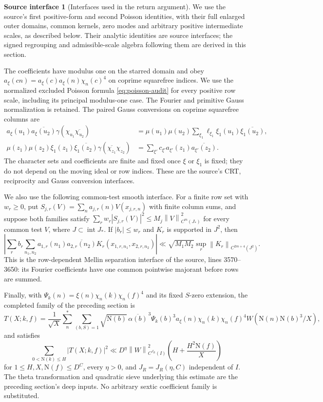 \documentclass[11pt]{article}
\numberwithin{equation}{section}
\theoremstyle{definition}
\newtheorem{assumption}[theorem]{Source interface}
\theoremstyle{remark}
\newcommand{\N}{\mathrm N}
\newcommand{\norm}[1]{\left\|#1\right\|}
\begin{document}
\begin{assumption}[Interfaces used in the return argument]
\label{ass:transfer-interfaces}
We use the source's first positive-form and second Poisson identities,
with their full enlarged outer domains, common kernels, zero modes
and arbitrary positive intermediate scales, as described below.
Their analytic identities are source interfaces; the signed
regrouping and admissible-scale algebra following them are derived
in this section.

The coefficients have modulus one on the starred domain and obey
$a_\xi(cn)=a_\xi(c)a_\xi(n)\chi_n(c)^4$ on coprime squarefree indices.
We use the normalized excluded Poisson formula \eqref{eq:poisson-audit}
for every positive row scale, including its principal modulus-one case.
The Fourier and primitive Gauss normalization is retained. The paired Gauss
conversions on coprime squarefree columns are
\[
\begin{aligned}
 a_\xi(u_1)\overline{a_\xi(u_2)}\gamma(\chi_{u_1}\overline{\chi_{u_2}})
 &=\mu(u_1)\mu(u_2)\sum_{\xi_1}\ell_{\xi_1}
       \xi_1(u_1)\overline{\xi_1(u_2)},\\
 \mu(z_1)\mu(z_2)\xi_1(z_1)\overline{\xi_1(z_2)}
 \gamma(\overline{\chi_{z_1}}\chi_{z_2})
 &=\sum_{\xi'}c_{\xi'}a_{\xi'}(z_1)\overline{a_{\xi'}(z_2)}.
\end{aligned}
\]
The character sets and coefficients are finite and fixed once $\xi$ or
$\xi_1$ is fixed; they do not depend on the moving ideal or row indices.
These are the source's CRT, reciprocity and Gauss conversion interfaces.

We also use the following common-test smooth interface. For a finite row
set with $w_r\ge0$, put $S_{j,r}(V)=\sum_n a_{j,r}(n)V(x_{j,r,n})$
with finite column sums, and suppose both families satisfy
$\sum_r w_r|S_{j,r}(V)|^2\le M_j\norm{V}_{C^m(J_*)}^2$ for every
common test $V$, where $J\subset\operatorname{int}J_*$. If
$|b_r|\le w_r$ and $K_r$ is supported in $J^2$, then
\[
 \left|\sum_r b_r\sum_{n_1,n_2}
 a_{1,r}(n_1)\overline{a_{2,r}(n_2)}K_r(x_{1,r,n_1},x_{2,r,n_2})\right|
 \ll\sqrt{M_1M_2}\sup_r\norm{K_r}_{C^{2m+4}(J^2)}.
\]
This is the row-dependent Mellin separation interface of the source,
lines 3570--3650: its Fourier coefficients have one common pointwise
majorant before rows are summed.

Finally, with $\Psi_k(n)=\xi(n)\chi_n(k)\chi_n(f)^4$ and its fixed
$S$-zero extension, the completed family of the preceding section is
\[
 T(X;k,f)=\frac1{\sqrt X}\sum_n^*\sum_{(b,S)=1}
 \sqrt{\N(b)}\,\overline{\alpha(b)}^{\,3}\Psi_k(b)^3
 a_\xi(n)\chi_n(k)\chi_n(f)^4W(\N(n)\N(b)^3/X),
\]
and satisfies
\[
 \sum_{0<\N(k)\le H}|T(X;k,f)|^2
 \ll D^\eta\norm{W}_{C^{J_R}(I)}^2
       \left(H+\frac{H^2\N(f)}X\right)
\]
for $1\le H,X,\N(f)\le D^C$, every $\eta>0$, and
$J_R=J_R(\eta,C)$ independent of $I$. The theta transformation and
quadratic sieve underlying this estimate are the preceding section's
deep inputs. No arbitrary sextic coefficient family is substituted.
\end{assumption}
\end{document}
